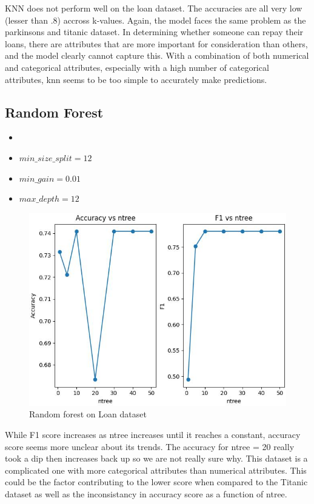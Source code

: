 \documentclass[letterpaper]{article}
\begin{document}
KNN does not perform well on the loan dataset. The accuracies are all very low (lesser than .8) accross k-values.
Again, the model faces the same problem as the parkinsons and titanic dataset. In determining whether someone can repay their loans, there are attributes that are more important for consideration than others, 
and the model clearly cannot capture this. With a combination of both numerical and categorical attributes, especially with a high number of categorical attributes, knn seems to be too simple to accurately make predictions.

\subsection*{Random Forest}
\begin{itemize}
	\item {}
	\item $min\_size\_split = 12$
	\item $min\_gain = 0.01$
	\item $max\_depth = 12$
\end{itemize}

\begin{figure}[H]
	\includegraphics[width=\textwidth]{figures/forest_loan.csv_ig.jpg}
	\caption{Random forest on Loan dataset}
	\label{fig:forest-loan}
\end{figure}

While F1 score increases as ntree increases until it reaches a constant, accuracy score seems more unclear about its trends. The accuracy for
ntree = 20 really took a dip then increases back up so we are not really sure why. This dataset is a complicated one with more categorical attributes
than numerical attributes. This could be the factor contributing to the lower score when compared to the Titanic dataset as well as the inconsistancy
in accuracy score as a function of ntree.
\end{document}
